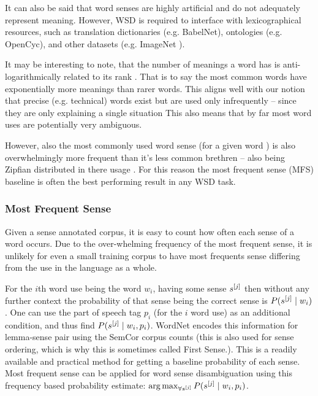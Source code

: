 \documentclass[12pt,parskip]{komatufte}
\begin{document}
It can also be said that word senses are highly artificial and do not adequately represent meaning.
However, WSD is required to interface with  lexicographical resources,
such as translation dictionaries (e.g. BabelNet), ontologies (e.g. OpenCyc), and other datasets (e.g. ImageNet ).


It may be interesting to note, that the number of meanings a word has is anti-logarithmically related to its rank .
That is to say the most common words have exponentially more meanings than rarer words.
This aligns well with our notion that precise (e.g. technical) words exist but are used only infrequently -- since they are only explaining a single situation
This also means that by far most word uses are potentially very ambiguous.

However, also the most commonly used word sense (for a given word ) is also overwhelmingly more frequent than it's less common brethren -- also being Zipfian distributed in there usage \cite{Kilgarriff2004}.
For this reason the most frequent sense (MFS) baseline is often the best performing result in any WSD task.

\subsubsection{Most Frequent Sense}\label{sec:most-frequent-sense}
Given a sense annotated corpus, it is easy to count how often each sense of a word occurs.
Due to the over-whelming frequency of the most frequent sense, it is unlikely for even a small training corpus to have most frequents sense differing from the use in the language as a whole.


For the $i$th word use being the word $w_i$, having some sense $\n s_j$
then without any further context the 
probability of that sense being the correct sense is $P(\n s_j \mid w_i)$.
One can use the part of speech tag $p_i$ (for the $i$ word use) as an additional condition, and thus find $P(\n s_j \mid w_i, p_i)$.
WordNet encodes this information for lemma-sense pair using the SemCor corpus counts (this is also used for sense ordering, which is why this is sometimes called First Sense.).
This is a readily available and practical method for getting a baseline probability of each sense.
Most frequent sense can be applied for word sense disambiguation using this frequency based probability estimate:  $\argmax_{\forall \n s_j} P(\n s_j \mid w_i, p_i)$.
\end{document}
